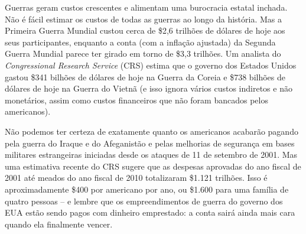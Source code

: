 Guerras geram custos crescentes e alimentam uma burocracia estatal inchada. Não é fácil estimar os custos de todas as guerras ao longo da história. Mas a Primeira Guerra Mundial custou cerca de \$2,6 trilhões de dólares de hoje aos seus participantes, enquanto a conta (com a inflação ajustada) da Segunda Guerra Mundial parece ter girado em torno de \$3,3 trilhões. Um analista do \emph{Congressional Research Service} (CRS) estima que o governo dos Estados Unidos gastou \$341 bilhões de dólares de hoje na Guerra da Coreia e \$738 bilhões de dólares de hoje na Guerra do Vietnã (e isso ignora vários custos indiretos e não monetários, assim como custos financeiros que não foram bancados pelos americanos).

Não podemos ter certeza de exatamente quanto os americanos acabarão pagando pela guerra do Iraque e do Afeganistão e pelas melhorias de segurança em bases militares estrangeiras iniciadas desde os ataques de 11 de setembro de 2001. Mas uma estimativa recente do CRS sugere que as despesas aprovadas do ano fiscal de 2001 até meados do ano fiscal de 2010 totalizaram \$1.121 trilhões. Isso é aproximadamente \$400 por americano por ano, ou \$1.600 para uma família de quatro pessoas -- e lembre que os empreendimentos de guerra do governo dos EUA estão sendo pagos com dinheiro emprestado: a conta sairá ainda mais cara quando ela finalmente vencer.

